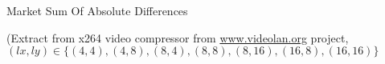 %
\begin{Frame}{Market Sum Of Absolute Differences}
 

(Extract from x264 video compressor from \url{www.videolan.org}
project, $(lx, ly) \in \{(4, 4), (4, 8), (8, 4), (8, 8), (8,16), (16,8), (16,16)\}$
\end{Frame}


